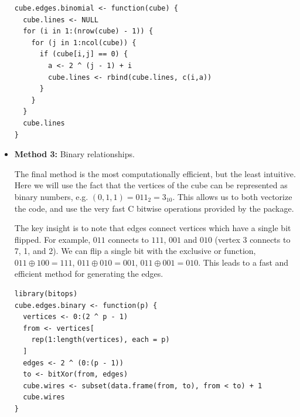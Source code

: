 \begin{itemize}
\begin{verbatim}
cube.edges.binomial <- function(cube) {
  cube.lines <- NULL
  for (i in 1:(nrow(cube) - 1)) {
    for (j in 1:ncol(cube)) {
      if (cube[i,j] == 0) {
        a <- 2 ^ (j - 1) + i
        cube.lines <- rbind(cube.lines, c(i,a))
      }
    }
  }
  cube.lines
}
\end{verbatim}

  \item {\bf Method 3:} Binary relationships.

    The final method is the most computationally efficient, but the
    least intuitive. Here we will use the fact that the vertices of
    the cube can be represented as binary numbers, e.g.  $(0, 1, 1) =
    011_2 = 3_{10}$. This allows us to both vectorize the code, and
    use the very fast C bitwise operations provided by the
     package.

    The key insight is to note that edges connect vertices which have
    a single bit flipped. For example, $011$ connects to $111$, $001$
    and $010$ (vertex 3 connects to 7, 1, and 2). We can flip a single
    bit with the exclusive or function, $011 \oplus 100 = 111$, $011
    \oplus 010 = 001$, $011 \oplus 001 = 010$.  This leads to a fast
    and efficient method for generating the edges.

\begin{verbatim}
library(bitops)
cube.edges.binary <- function(p) {
  vertices <- 0:(2 ^ p - 1)
  from <- vertices[
    rep(1:length(vertices), each = p)
  ]
  edges <- 2 ^ (0:(p - 1))
  to <- bitXor(from, edges)
  cube.wires <- subset(data.frame(from, to), from < to) + 1
  cube.wires
}
\end{verbatim}

\end{itemize}

